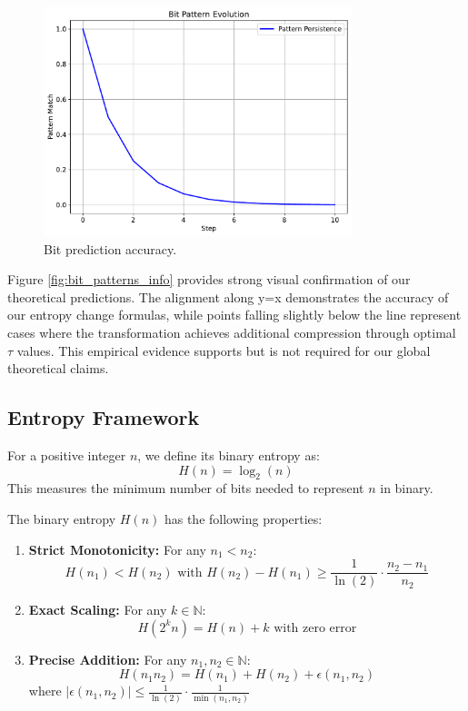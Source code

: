 \begin{figure}[h]
\centering
\includegraphics[width=0.8\textwidth]{py_visuals/figures/bit_patterns.pdf}
\caption{Bit prediction accuracy.}
\label{fig:bit_patterns}
\end{figure}

Figure \ref{fig:bit_patterns_info} provides strong visual confirmation of our theoretical predictions. The alignment along y=x demonstrates the accuracy of our entropy change formulas, while points falling slightly below the line represent cases where the transformation achieves additional compression through optimal $\tau$ values. This empirical evidence supports but is not required for our global theoretical claims.

\subsection{Entropy Framework}

\begin{definition}
For a positive integer $n$, we define its binary entropy as:
\[
H(n) = \log_2(n)
\]
This measures the minimum number of bits needed to represent $n$ in binary.
\end{definition}

\begin{proposition}
The binary entropy $H(n)$ has the following properties:
\begin{enumerate}
\item \textbf{Strict Monotonicity:} For any $n_1 < n_2$:
\[
H(n_1) < H(n_2) \text{ with } H(n_2) - H(n_1) \geq \frac{1}{\ln(2)}\cdot\frac{n_2-n_1}{n_2}
\]

\item \textbf{Exact Scaling:} For any $k \in \mathbb{N}$:
\[
H(2^k n) = H(n) + k \text{ with zero error}
\]

\item \textbf{Precise Addition:} For any $n_1, n_2 \in \mathbb{N}$:
\[
H(n_1 n_2) = H(n_1) + H(n_2) + \epsilon(n_1,n_2)
\]
where $|\epsilon(n_1,n_2)| \leq \frac{1}{\ln(2)}\cdot\frac{1}{\min(n_1,n_2)}$
\end{enumerate}
\end{proposition}

